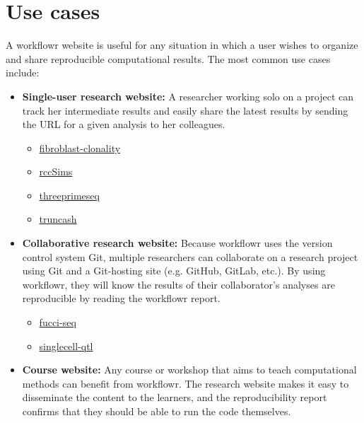 \documentclass[9pt,a4paper]{extarticle}
\begin{document}
\section*{Use cases}

A workflowr website is useful for any situation in which a user wishes
to organize and share reproducible computational results. The most
common use cases include:

\begin{itemize}

\item \textbf{Single-user research website:} A researcher working solo
on a project can track her intermediate results and easily share the
latest results by sending the URL for a given analysis to her
colleagues.

\begin{itemize}

\item
\href{https://davismcc.github.io/fibroblast-clonality/}{fibroblast-clonality}

\item \href{https://jean997.github.io/rccSims/}{rccSims}

\item
\href{https://brimittleman.github.io/threeprimeseq/}{threeprimeseq}

\item \href{https://lsun.github.io/truncash/}{truncash}

\end{itemize}

\item \textbf{Collaborative research website:} Because workflowr uses
the version control system Git, multiple researchers can collaborate on
a research project using Git and a Git-hosting site (e.g. GitHub,
GitLab, etc.). By using workflowr, they will know the results of their
collaborator’s analyses are reproducible by reading the workflowr
report.

\begin{itemize}

\item \href{https://jdblischak.github.io/fucci-seq/}{fucci-seq}

\item
\href{https://jdblischak.github.io/singlecell-qtl/}{singlecell-qtl}

\end{itemize}

\item \textbf{Course website:} Any course or workshop that aims to teach
computational methods can benefit from workflowr. The research website
makes it easy to disseminate the content to the learners, and the
reproducibility report confirms that they should be able to run the code
themselves.


\end{itemize}
\end{document}
